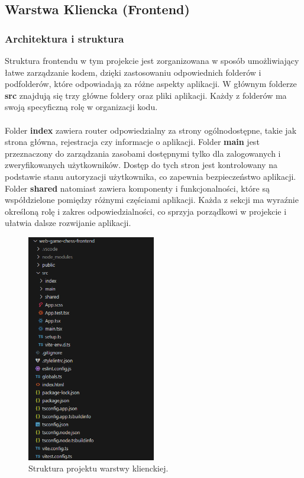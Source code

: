 \documentclass[12pt,a4paper]{article}
\begin{document}
\newpage
\subsection{Warstwa Kliencka (Frontend)}
\subsubsection{Architektura i struktura}

Struktura frontendu w tym projekcie jest zorganizowana w sposób umożliwiający łatwe zarządzanie kodem, dzięki zastosowaniu odpowiednich folderów i podfolderów, które odpowiadają za różne aspekty aplikacji. W głównym folderze \textbf{src} znajdują się trzy główne foldery oraz pliki aplikacji. Każdy z folderów ma swoją specyficzną rolę w organizacji kodu.
\\\\
Folder \textbf{index} zawiera router odpowiedzialny za strony ogólnodostępne, takie jak strona główna, rejestracja czy informacje o aplikacji. Folder \textbf{main} jest przeznaczony do zarządzania zasobami dostępnymi tylko dla zalogowanych i zweryfikowanych użytkowników. Dostęp do tych stron jest kontrolowany na podstawie stanu autoryzacji użytkownika, co zapewnia bezpieczeństwo aplikacji. Folder \textbf{shared} natomiast zawiera komponenty i funkcjonalności, które są współdzielone pomiędzy różnymi częściami aplikacji. Każda z sekcji ma wyraźnie określoną rolę i zakres odpowiedzialności, co sprzyja porządkowi w projekcie i ułatwia dalsze rozwijanie aplikacji.

\vspace{0.5cm}
\begin{figure}[h!]
    \centering
    \includegraphics[width=0.5\textwidth]{images/struktura_front.png}
    \caption{Struktura projektu warstwy klienckiej.}
\end{figure}
\end{document}
